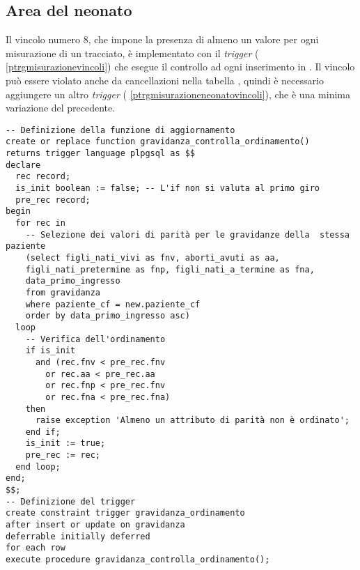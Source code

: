 \subsection{Area del neonato}
\label{triggersnewborn}

Il vincolo numero 8, che impone la presenza di almeno un valore per ogni misurazione di un tracciato, è implementato con il \emph{trigger}  (\lstlistingname{} \ref{ptrgmisurazionevincoli}) che esegue il controllo ad ogni inserimento in .
Il vincolo può essere violato anche da cancellazioni nella tabella , quindi è necessario aggiungere un altro \emph{trigger} (\lstlistingname{} \ref{ptrgmisurazioneneonatovincoli}), che è una minima variazione del precedente.

\FloatBarrier

\begin{lstlisting}[float,caption={Definizione del \emph{trigger} \tab{gravidanza\_ordinamento}.},label=ptrggravidanzaordinamento]
-- Definizione della funzione di aggiornamento
create or replace function gravidanza_controlla_ordinamento()
returns trigger language plpgsql as $$
declare
  rec record;
  is_init boolean := false; -- L'if non si valuta al primo giro
  pre_rec record;
begin
  for rec in
    -- Selezione dei valori di parità per le gravidanze della  stessa paziente
    (select figli_nati_vivi as fnv, aborti_avuti as aa,
    figli_nati_pretermine as fnp, figli_nati_a_termine as fna,
    data_primo_ingresso
    from gravidanza
    where paziente_cf = new.paziente_cf
    order by data_primo_ingresso asc)
  loop
    -- Verifica dell'ordinamento
    if is_init
      and (rec.fnv < pre_rec.fnv
        or rec.aa < pre_rec.aa
        or rec.fnp < pre_rec.fnv
        or rec.fna < pre_rec.fna)
    then
      raise exception 'Almeno un attributo di parità non è ordinato';
    end if;
    is_init := true;
    pre_rec := rec;
  end loop;
end;
$$;
-- Definizione del trigger
create constraint trigger gravidanza_ordinamento
after insert or update on gravidanza
deferrable initially deferred
for each row
execute procedure gravidanza_controlla_ordinamento();
\end{lstlisting}

